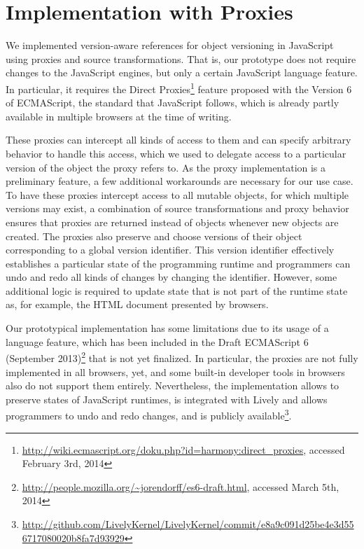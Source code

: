 \chapter{Implementation with Proxies} \label{chapter:IMPLEMENTATION}

We implemented version-aware references for object versioning in JavaScript using proxies and source transformations.
That is, our prototype does not require changes to the JavaScript engines, but only a certain JavaScript language feature.
In particular, it requires the Direct Proxies\footnote{\url{http://wiki.ecmascript.org/doku.php?id=harmony:direct_proxies}, accessed February 3rd, 2014} feature proposed with the Version 6 of ECMAScript, the standard that JavaScript follows, which is already partly available in multiple browsers at the time of writing.

These proxies can intercept all kinds of access to them and can specify arbitrary behavior to handle this access, which we used to delegate access to a particular version of the object the proxy refers to.
As the proxy implementation is a preliminary feature, a few additional workarounds are necessary for our use case.
To have these proxies intercept access to all mutable objects, for which multiple versions may exist, a combination of source transformations and proxy behavior ensures that proxies are returned instead of objects whenever new objects are created.
The proxies also preserve and choose versions of their object corresponding to a global version identifier.
This version identifier effectively establishes a particular state of the programming runtime and programmers can undo and redo all kinds of changes by changing the identifier.
However, some additional logic is required to update state that is not part of the runtime state as, for example, the HTML document presented by browsers.

Our prototypical implementation has some limitations due to its usage of a language feature, which has been included in the Draft ECMAScript 6 (September 2013)\footnote{\url{http://people.mozilla.org/~jorendorff/es6-draft.html}, accessed March 5th, 2014} that is not yet finalized.
In particular, the proxies are not fully implemented in all browsers, yet, and some built-in developer tools in browsers also do not support them entirely.
Nevertheless, the implementation allows to preserve states of JavaScript runtimes, is integrated with Lively and allows programmers to undo and redo changes, and is publicly available\footnote{\url{http://github.com/LivelyKernel/LivelyKernel/commit/e8a9c091d25be4e3d556717080020b8fa7d93929}}.



